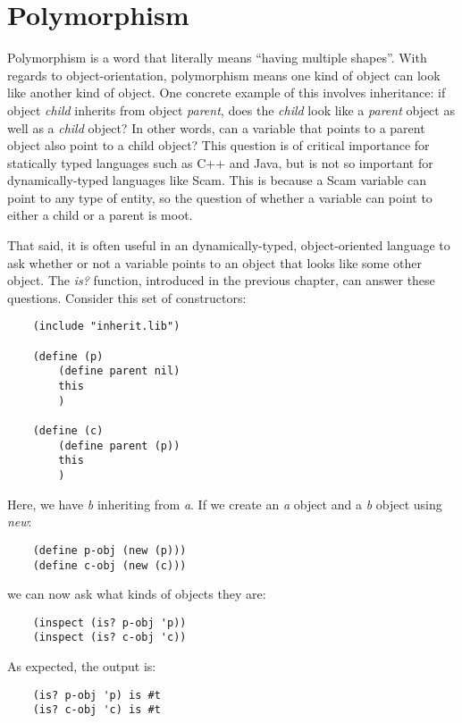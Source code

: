 \section{Polymorphism}

Polymorphism is a word that literally means ``having multiple shapes''.
With regards to object-orientation, polymorphism means one kind of object
can look like another kind of object. One concrete example of this
involves inheritance: if object {\it child} inherits from object {\it parent},
does the {\it child} look like a {\it parent} object
as well as a {\it child} object? In
other words, can a variable that points to a parent object also
point to a child object? This question is of critical importance
for statically typed languages such as C++ and Java, but is not
so important for dynamically-typed languages like Scam.
This is because a Scam variable can point to any type of entity,
so the question of whether a variable can point to either a child
or a parent is moot.

That said, it is often useful in an dynamically-typed, object-oriented
language to ask whether or not a variable points to an object that
looks like some other object. The {\it is?} function, introduced in the
previous chapter, can answer these questions. Consider this set
of constructors:

\begin{verbatim}
    (include "inherit.lib")

    (define (p)
        (define parent nil)
        this
        )

    (define (c)
        (define parent (p))
        this
        )
\end{verbatim}

Here, we have {\it b} inheriting from {\it a}.
If we create an {\it a} object and a {\it b} object using {\it new}:

\begin{verbatim}
    (define p-obj (new (p)))
    (define c-obj (new (c)))
\end{verbatim}

we can now ask what kinds of objects they are:

\begin{verbatim}
    (inspect (is? p-obj 'p))
    (inspect (is? c-obj 'c))
\end{verbatim}

As expected, the output is:

\begin{verbatim}
    (is? p-obj 'p) is #t
    (is? c-obj 'c) is #t
\end{verbatim}

